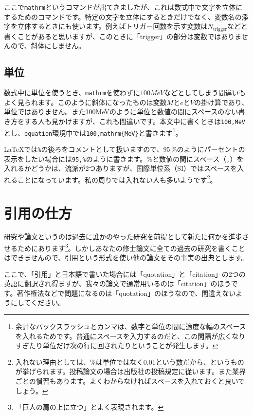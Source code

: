ここで\texttt{\bs{}mathrm}というコマンドが出てきましたが、これは数式中で文字を立体にするためのコマンドです。特定の文字を立体にするときだけでなく、変数名の添字を立体するときにも使います。例えばトリガー回数を示す変数は$N_\mathrm{trigger}$などと書くことがあると思いますが、このときに「trigger」の部分は変数ではありませんので、斜体にしません。

\subsection{単位}
数式中に単位を使うとき、\texttt{\bs{}mathrm}を使わずに$100 MeV$などとしてしまう間違いもよく見られます。このように斜体になったものは変数$M$と$e$と$V$の掛け算であり、単位ではありません。また100MeVのように単位と数値の間にスペースのない書き方をする人も見かけますが、これも間違いです。本文中に書くときは\texttt{100\bs{},MeV}とし、\texttt{equation}環境中では\texttt{100\bs{},\bs{}mathrm\{MeV\}}と書きます\footnote{余計なバックスラッシュとカンマは、数字と単位の間に適度な幅のスペースを入れるためです。普通にスペースを入力するのだと、この間隔が広くなりすぎたり単位だけ次の行に回されたりということが発生します。}。

\LaTeX{}では\texttt{\%}の後ろをコメントとして扱いますので、95\,\%のようにパーセントの表示をしたい場合には\texttt{95\bs{},\bs{}\%}のように書きます。\%と数値の間にスペース（\texttt{\bs{},}）を入れるかどうかは、流派が2つありますが、国際単位系（SI）ではスペースを入れることになっています。私の周りでは入れない人も多いようです\footnote{入れない理由としては、\%は単位ではなく0.01という数だから、というものが挙げられます。投稿論文の場合は出版社の投稿規定に従います。また業界ごとの慣習もあります。よくわからなければスペースを入れておくと良いでしょう。}。

\section{引用の仕方}

研究や論文というのは過去に誰かのやった研究を前提として新たに何かを進歩させるためにあります\footnote{「巨人の肩の上に立つ」とよく表現されます。}。しかしあなたの修士論文に全ての過去の研究を書くことはできませんので、引用という形式を使い他の論文をその事実の出典とします。

ここで、「引用」と日本語で書いた場合には「quotation」と「citation」の2つの英語に翻訳され得ますが、我々の論文で通常用いるのは「citation」のほうです。著作権法などで問題になるのは「quotation」のほうなので、間違えないようにしてください。

